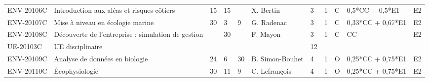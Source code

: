 \documentclass[a4paper,11pt]{article}
\begin{document}
{{\begin{tabular}{lllllllllll}
ENV-20106C                     & Introduction aux aléas et risques côtiers                                                 & 15                        & 15                        &                           & X. Bertin                          & 3                           & 1                           & C                                  & 0,5*CC + 0,5*E1                  & E2                               \\
ENV-20107C                     & Mise à niveau en écologie marine                                                          & 30                        & 3                         & 9                         & G. Radenac                         & 3                           & 1                           & C                                  & 0,33*CC + 0,67*E1                & E2                               \\
ENV-20108C                     & Découverte de l'entreprise : simulation de gestion                                        &                           & 30                        &                           & F. Mayon                           & 3                           & 1                           & C                                  & CC                               & E2                               \\
\rowcolor[HTML]{C0C0C0} 
UE-20103C                      & UE disciplinaire                                                                          &                           &                           &                           &                                    & 12                          &                             &                                    &                                  &                                  \\
ENV-20109C                     & Analyse de données en biologie                                                            & 24                        & 6                         & 30                        & B. Simon-Bouhet                    & 4                           & 1                           & O                                  & 0,25*CC + 0,75*E1                & E2                               \\
ENV-20110C                     & Écophysiologie                                                                            & 30                        & 11                        & 9                         & C. Lefrançois                      & 4                           & 1                           & O                                  & 0,25*CC + 0,75*E1                & E2                               \\

\end{tabular}}}
\end{document}
